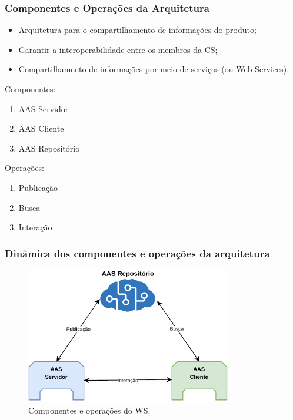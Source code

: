 \documentclass[10pt]{beamer}
\begin{document}
\begin{frame}
	\frametitle{Componentes e Operações da Arquitetura}
	
	\begin{itemize}
		\item Arquitetura para o compartilhamento de informações do produto;
		\item Garantir a interoperabilidade entre os membros da CS;
		\item Compartilhamento de informações por meio de serviços (ou Web Services).
	\end{itemize}

	Componentes:
	\begin{enumerate}
		\item AAS Servidor
		\item AAS Cliente
		\item AAS Repositório
	\end{enumerate}

	Operações:
	\begin{enumerate}
		\item Publicação
		\item Busca
		\item Interação
	\end{enumerate}
	
\end{frame}
\begin{frame}
	\frametitle{Dinâmica dos componentes e operações da arquitetura}
	
	\begin{figure}[htb]
		\centering
		\caption{Componentes e operações do WS.}
		\label{fig:aas-ws}
		\includegraphics[width=0.8\textwidth]{aas-ws}
	\end{figure}
	
\end{frame}
\end{document}

